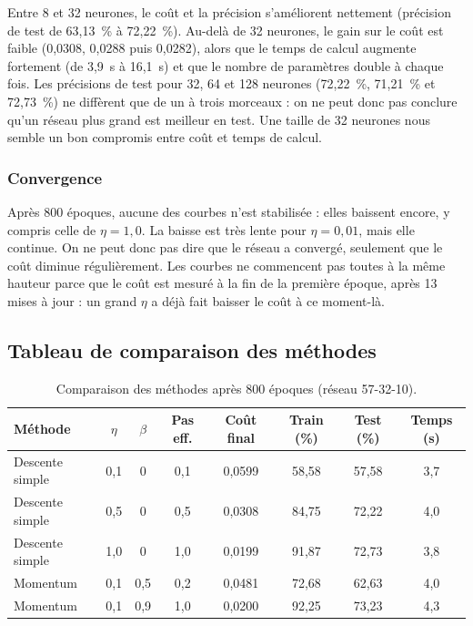 Entre 8 et 32 neurones, le coût et la précision s'améliorent nettement
(précision de test de 63,13~\% à 72,22~\%). Au-delà de 32 neurones, le gain sur
le coût est faible (0,0308, 0,0288 puis 0,0282), alors que le temps de
calcul augmente fortement (de 3,9~s à 16,1~s) et que le nombre de paramètres
double à chaque fois. Les précisions de test pour 32, 64 et 128 neurones
(72,22~\%, 71,21~\% et 72,73~\%) ne diffèrent que de un à trois morceaux : on ne
peut donc pas conclure qu'un réseau plus grand est meilleur en test.
Une taille de 32 neurones nous semble un bon compromis entre coût et temps de
calcul.

\subsubsection{Convergence}

Après 800 époques, aucune des courbes n'est stabilisée : elles baissent
encore, y compris celle de $\eta = 1{,}0$. La baisse est très lente pour
$\eta = 0{,}01$, mais elle continue. On ne peut donc pas dire que le réseau
a convergé, seulement que le coût diminue régulièrement. Les courbes ne
commencent pas toutes à la même hauteur parce que le coût est mesuré à la
fin de la première époque, après 13 mises à jour : un grand $\eta$ a déjà fait
baisser le coût à ce moment-là.

\subsection{Tableau de comparaison des méthodes}

\begin{table}[ht]
\centering
\small
\setlength{\tabcolsep}{4pt}
\begin{tabular}{lccccccc}
\toprule
Méthode & $\eta$ & $\beta$ & Pas eff. & Coût final & Train (\%) & Test (\%)
 & Temps (s) \\
\midrule
Descente simple & 0,1 & 0   & 0,1 & 0,0599 & 58,58 & 57,58 & 3,7 \\
Descente simple & 0,5 & 0   & 0,5 & 0,0308 & 84,75 & 72,22 & 4,0 \\
Descente simple & 1,0 & 0   & 1,0 & 0,0199 & 91,87 & 72,73 & 3,8 \\
Momentum        & 0,1 & 0,5 & 0,2 & 0,0481 & 72,68 & 62,63 & 4,0 \\
Momentum        & 0,1 & 0,9 & 1,0 & 0,0200 & 92,25 & 73,23 & 4,3 \\
\bottomrule
\end{tabular}
\caption{Comparaison des méthodes après 800 époques (réseau 57-32-10).}
\label{tab:comparaison}
\end{table}

